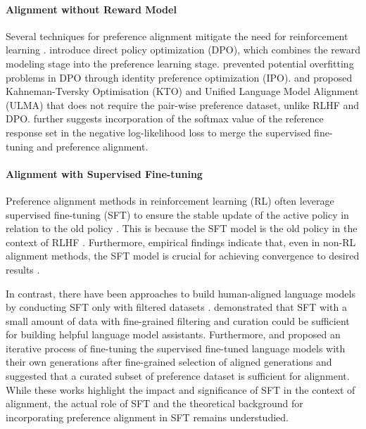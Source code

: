 \paragraph{Alignment without Reward Model} Several techniques for preference alignment mitigate the need for reinforcement learning \citep{rafailov2023direct, song2023preference, azar2023general, ethayarajh2023halos}. \citet{rafailov2023direct} introduce direct policy optimization (DPO), which combines the reward modeling stage into the preference learning stage. \citet{azar2023general} prevented potential overfitting problems in DPO through identity preference optimization (IPO). \citet{ethayarajh2023halos} and \citet{Cai2023ULMAUL} proposed Kahneman-Tversky Optimisation (KTO) and Unified Language Model Alignment (ULMA) that does not require the pair-wise preference dataset, unlike RLHF and DPO. \citet{song2023preference} further suggests incorporation of the softmax value of the reference response set in the negative log-likelihood loss to merge the supervised fine-tuning and preference alignment. 

\paragraph{Alignment with Supervised Fine-tuning} Preference alignment methods in reinforcement learning (RL) often leverage supervised fine-tuning (SFT) to ensure the stable update of the active policy in relation to the old policy \citep{schulman2017proximal}. This is because the SFT model is the old policy in the context of RLHF \citep{ziegler2020finetuning}. Furthermore, empirical findings indicate that, even in non-RL alignment methods, the SFT model is crucial for achieving convergence to desired results \citep{rafailov2023direct, tunstall2023zephyr}. 

In contrast, there have been approaches to build human-aligned language models by conducting SFT only with filtered datasets \citep{zhou2023lima, li2023selfalignment, haggerty2024selfsupervised, Zhou2023LoBaSSGL}. \citet{zhou2023lima} demonstrated that SFT with a small amount of data with fine-grained filtering and curation could be sufficient for building helpful language model assistants. Furthermore, \citet{li2023selfalignment} and \citet{haggerty2024selfsupervised} proposed an iterative process of fine-tuning the supervised fine-tuned language models with their own generations after fine-grained selection of aligned generations and \citet{Zhou2023LoBaSSGL} suggested that a curated subset of preference dataset is sufficient for alignment. While these works highlight the impact and significance of SFT in the context of alignment, the actual role of SFT and the theoretical background for incorporating preference alignment in SFT remains understudied.

